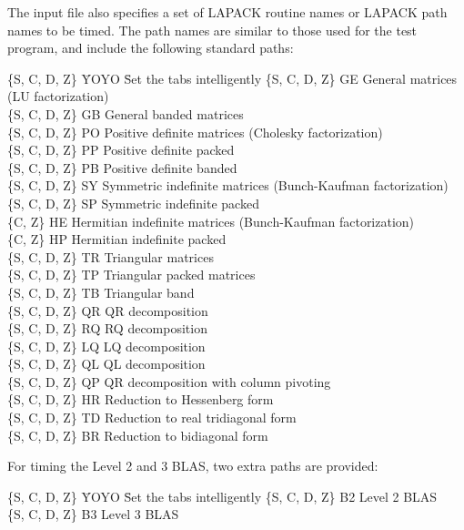 The input file also specifies a set of LAPACK routine names or LAPACK
path names to be timed.  The path names are similar to those used for
the test program, and include the following standard paths:
\begin{tabbing}
\{S, C, D, Z\}  \=  YOYO \=  Set the tabs intelligently \kill
\{S, C, D, Z\}  \>  GE  \>  General matrices (LU factorization) \\
\{S, C, D, Z\}  \>  GB  \>  General banded matrices \\
\{S, C, D, Z\}  \>  PO  \>  Positive definite matrices (Cholesky factorization) \\
\{S, C, D, Z\}  \>  PP  \>  Positive definite packed \\
\{S, C, D, Z\}  \>  PB  \>  Positive definite banded \\
\{S, C, D, Z\}  \>  SY  \>  Symmetric indefinite matrices (Bunch-Kaufman factorization) \\
\{S, C, D, Z\}  \>  SP  \>  Symmetric indefinite packed \\
\{C, Z\}        \>  HE  \>  Hermitian indefinite matrices (Bunch-Kaufman factorization) \\
\{C, Z\}        \>  HP  \>  Hermitian indefinite packed \\
\{S, C, D, Z\}  \>  TR  \>  Triangular matrices \\
\{S, C, D, Z\}  \>  TP  \>  Triangular packed matrices \\
\{S, C, D, Z\}  \>  TB  \>  Triangular band \\
\{S, C, D, Z\}  \>  QR  \>  QR decomposition \\
\{S, C, D, Z\}  \>  RQ  \>  RQ decomposition \\
\{S, C, D, Z\}  \>  LQ  \>  LQ decomposition \\
\{S, C, D, Z\}  \>  QL  \>  QL decomposition \\
\{S, C, D, Z\}  \>  QP  \>  QR decomposition with column pivoting \\
\{S, C, D, Z\}  \>  HR   \> Reduction to Hessenberg form \\
\{S, C, D, Z\}  \>  TD   \> Reduction to real tridiagonal form \\
\{S, C, D, Z\}  \>  BR   \> Reduction to bidiagonal form
\end{tabbing}

\noindent
For timing the Level 2 and 3 BLAS, two extra paths are provided:
\begin{tabbing}
\{S, C, D, Z\}  \=  YOYO \=  Set the tabs intelligently \kill
\{S, C, D, Z\}  \>  B2   \>  Level 2 BLAS \\
\{S, C, D, Z\}  \>  B3   \>  Level 3 BLAS
\end{tabbing}

